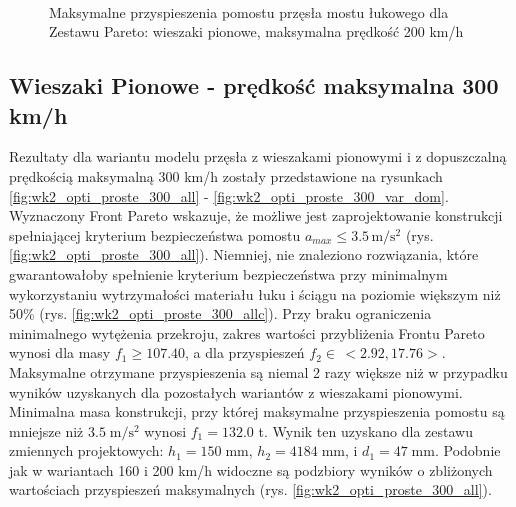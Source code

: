 \begin{figure}[hbt!]
	\centering
	\\
	\captionsetup{justification=centering}
	\caption{Maksymalne przyspieszenia pomostu przęsła mostu łukowego dla Zestawu Pareto: wieszaki pionowe, maksymalna prędkość 200 km/h}
	\label{fig:wk2_opti_proste_200_var_dom}
\end{figure}







\pagebreak[4]
\subsection{Wieszaki Pionowe - prędkość maksymalna 300 km/h}

Rezultaty dla wariantu modelu przęsła z wieszakami pionowymi i z dopuszczalną prędkością maksymalną 300 km/h zostały przedstawione na rysunkach \ref{fig:wk2_opti_proste_300_all} - \ref{fig:wk2_opti_proste_300_var_dom}. Wyznaczony Front Pareto wskazuje, że możliwe jest zaprojektowanie konstrukcji spełniającej kryterium bezpieczeństwa pomostu $a_{max}\le 3.5\,\mathrm{m/s^2}$ (rys. \ref{fig:wk2_opti_proste_300_all}). Niemniej, nie znaleziono rozwiązania, które gwarantowałoby spełnienie kryterium bezpieczeństwa przy minimalnym wykorzystaniu wytrzymałości materiału łuku i ściągu na poziomie większym niż 50\% (rys. \ref{fig:wk2_opti_proste_300_allc}). Przy braku ograniczenia minimalnego wytężenia przekroju, zakres wartości przybliżenia Frontu Pareto wynosi dla masy $f_1 \ge 107.40$, a dla przyspieszeń $f_2 \in\,<2.92,17.76>$. Maksymalne otrzymane przyspieszenia są niemal 2 razy większe niż w przypadku wyników uzyskanych dla pozostałych wariantów z wieszakami pionowymi. Minimalna masa konstrukcji, przy której maksymalne przyspieszenia pomostu są mniejsze niż $3.5\;\mathrm{m/s^2}$ wynosi $f_1 = 132.0$ t. Wynik ten uzyskano dla zestawu zmiennych projektowych: $h_1 = 150\;\mathrm{mm}$, $h_2 = 4184\;\mathrm{mm}$, i $d_1 = 47\;\mathrm{mm}$. Podobnie jak w wariantach 160 i 200 km/h widoczne są podzbiory wyników o zbliżonych wartościach przyspieszeń maksymalnych (rys. \ref{fig:wk2_opti_proste_300_all}). 

